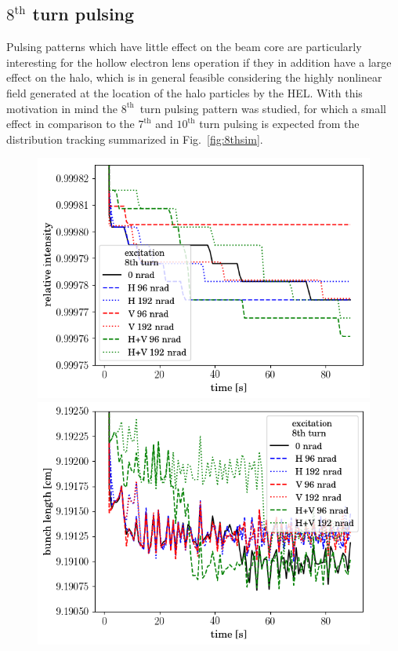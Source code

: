 \documentclass[%
 reprint,
 amsmath,amssymb,
 aps,
prstab,
]{revtex4-1}
\begin{document}
\subsection{$8^{\mathrm{th}}$ turn pulsing\label{sec:simex8}}
Pulsing patterns which have little effect on the beam core are particularly interesting for the hollow electron lens operation if they in addition have a large effect on the halo, which is in general feasible considering the highly nonlinear field generated at the location of the halo particles by the HEL. With this motivation in mind the $8^{\mathrm{th}}$~turn pulsing pattern was studied, for which a small effect in comparison to the $7^{\mathrm{th}}$ and $10^{\mathrm{th}}$ turn pulsing is expected from the distribution tracking summarized in Fig.~\ref{fig:8thsim}.
\begin{figure}[h]
	\begin{minipage}[t]{0.49\linewidth}
		\centering
		\includegraphics[width=1.0\linewidth]{2017injerra2b2uran1_2e-3_8th_3_5um_intensity.png}
	\end{minipage}
	\begin{minipage}[t]{0.49\linewidth}
		\centering
		\includegraphics[width=1.0\linewidth]{2017injerra2b2uran1_2e-3_8th_3_5um_sigm.png}

\end{minipage}
\end{figure}
\end{document}
